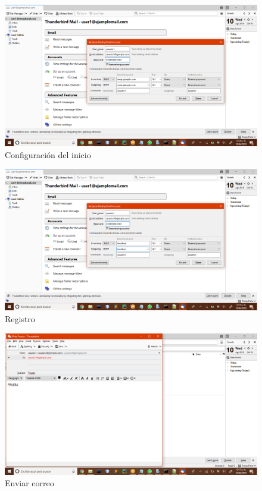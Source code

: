 \begin{figure}[H]
    \centering
    \includegraphics[scale=.30]{imagenes/primero/ConfiguracionInicio.png}
    \caption{Configuración del inicio}
    \label{fig:smtp26}
\end{figure}

\begin{figure}[H]
    \centering
    \includegraphics[scale=.30]{imagenes/primero/RegistroThunderbird.png}
    \caption{Registro}
    \label{fig:smtp27}
\end{figure}

\begin{figure}[H]
    \centering
    \includegraphics[scale=.30]{imagenes/primero/EnviarCorreo.png}
    \caption{Enviar correo}
    \label{fig:smtp28}
\end{figure}

